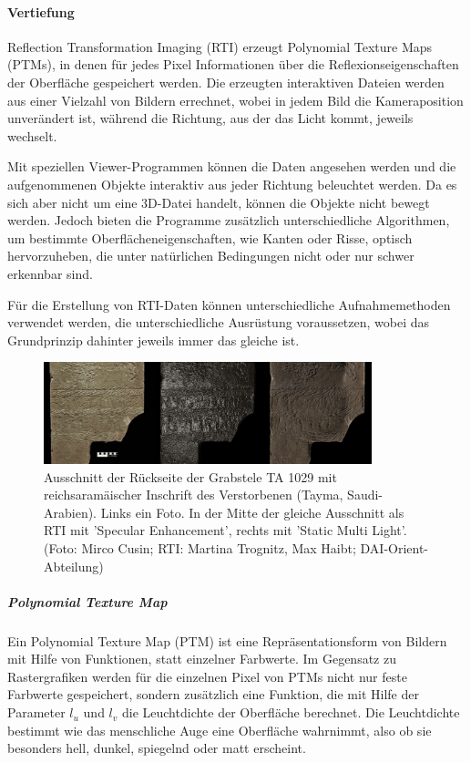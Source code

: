 \paragraph{Vertiefung}
Reflection Transformation Imaging (RTI) erzeugt Polynomial Texture Maps (PTMs), in denen für jedes Pixel Informationen über die Reflexionseigenschaften der Oberfläche gespeichert werden. Die erzeugten interaktiven Dateien werden aus einer Vielzahl von Bildern errechnet, wobei in jedem Bild die Kameraposition unverändert ist, während die Richtung, aus der das Licht kommt, jeweils wechselt.

Mit speziellen Viewer-Programmen können die Daten angesehen werden und die aufgenommenen Objekte interaktiv aus jeder Richtung beleuchtet werden. Da es sich aber nicht um eine 3D-Datei handelt, können die Objekte nicht bewegt werden. Jedoch bieten die Programme zusätzlich unterschiedliche Algorithmen, um bestimmte Oberflächeneigenschaften, wie Kanten oder Risse, optisch hervorzuheben, die unter natürlichen Bedingungen nicht oder nur schwer erkennbar sind.

Für die Erstellung von RTI-Daten können unterschiedliche Aufnahmemethoden verwendet werden, die unterschiedliche Ausrüstung voraussetzen, wobei das Grundprinzip dahinter jeweils immer das gleiche ist.

\begin{figure}[!hpt]
  \begin{center}
    \includegraphics[width=0.85\textwidth]{bilder/rti_TA01029}
  \end{center}
  \caption{Ausschnitt der Rückseite der Grabstele TA 1029 mit reichsaramäischer Inschrift des Verstorbenen (Tayma, Saudi-Arabien). Links ein Foto. In der Mitte der gleiche Ausschnitt als RTI mit 'Specular Enhancement', rechts mit 'Static Multi Light'. (Foto: Mirco Cusin; RTI: Martina Trognitz, Max Haibt; DAI-Orient-Abteilung)}
\end{figure} 

\subparagraph{Polynomial Texture Map}
Ein Polynomial Texture Map (PTM) ist eine Repräsentationsform von Bildern mit Hilfe von Funktionen, statt einzelner Farbwerte. Im Gegensatz zu Rastergrafiken werden für die einzelnen Pixel von PTMs nicht nur feste Farbwerte gespeichert, sondern zusätzlich eine Funktion, die mit Hilfe der Parameter $l_u$ und $l_v$ die Leuchtdichte der Oberfläche berechnet. Die Leuchtdichte bestimmt wie das menschliche Auge eine Oberfläche wahrnimmt, also ob sie besonders hell, dunkel, spiegelnd oder matt erscheint.

